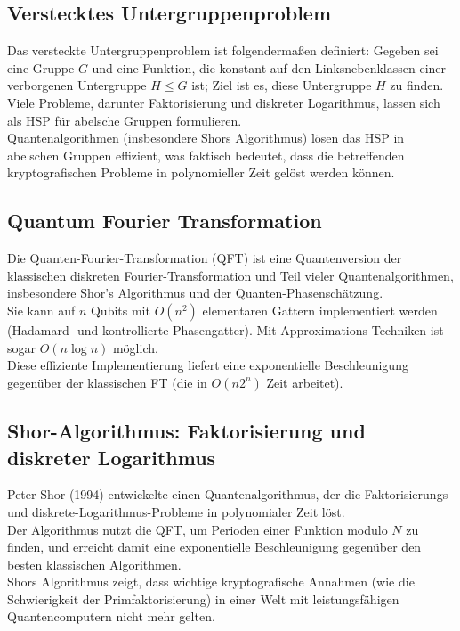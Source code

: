 \subsection{Verstecktes Untergruppenproblem}

Das versteckte Untergruppenproblem ist folgendermaßen definiert: Gegeben sei eine Gruppe $G$ und eine Funktion, die konstant auf den Linksnebenklassen einer verborgenen Untergruppe $H \le G$ ist; Ziel ist es, diese Untergruppe $H$ zu finden.\\
Viele Probleme, darunter Faktorisierung und diskreter Logarithmus, lassen sich als HSP für abelsche Gruppen formulieren.\\
Quantenalgorithmen (insbesondere Shors Algorithmus) lösen das HSP in abelschen Gruppen effizient, was faktisch bedeutet, dass die betreffenden kryptografischen Probleme in polynomieller Zeit gelöst werden können.

\subsection{Quantum Fourier Transformation}

Die Quanten-Fourier-Transformation (QFT) ist eine Quantenversion der klassischen diskreten Fourier-Transformation und Teil vieler Quantenalgorithmen, insbesondere Shor’s Algorithmus und der Quanten-Phasenschätzung.\\
Sie kann auf $n$ Qubits mit $O(n^2)$ elementaren Gattern implementiert werden (Hadamard- und kontrollierte Phasengatter). Mit Approximations-Techniken ist sogar $O(n\log n)$ möglich.\\
Diese effiziente Implementierung liefert eine exponentielle Beschleunigung gegenüber der klassischen FT (die in $O(n2^n)$ Zeit arbeitet).

\subsection{Shor-Algorithmus: Faktorisierung und diskreter Logarithmus}

Peter Shor (1994) entwickelte einen Quantenalgorithmus, der die Faktorisierungs- und diskrete-Logarithmus-Probleme in polynomialer Zeit löst.\\
Der Algorithmus nutzt die QFT, um Perioden einer Funktion modulo $N$ zu finden, und erreicht damit eine exponentielle Beschleunigung gegenüber den besten klassischen Algorithmen.\\
Shors Algorithmus zeigt, dass wichtige kryptografische Annahmen (wie die Schwierigkeit der Primfaktorisierung) in einer Welt mit leistungsfähigen Quantencomputern nicht mehr gelten.

